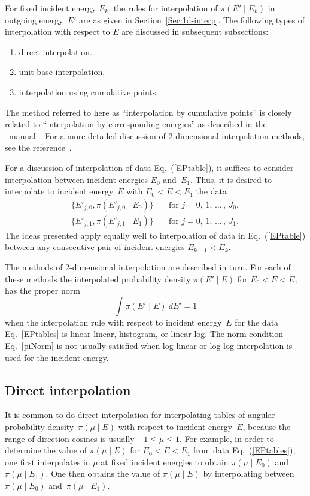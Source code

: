 For fixed incident energy $E_k$, the rules for interpolation of 
$\pi(E' \mid E_k )$ in outgoing energy~$E'$ are as given
in Section~\ref{Sec:1d-interp}.  The following types
of interpolation with respect to $E$ are discussed in subsequent subsections:
\begin{enumerate}
 \item direct interpolation.
 \item unit-base interpolation,
 \item interpolation using cumulative points.
\end{enumerate}

The method referred to here as ``interpolation by cumulative points''
is closely related to ``interpolation by corresponding energies'' as described
in the \ENDF\ manual~\cite{ENDFB}.  
For a more-detailed discussion of 2-dimensional interpolation methods,
see the reference~\cite{interpolation}.

For a discussion of interpolation of data Eq.~(\ref{EPtable}), it suffices
to consider interpolation between incident energies $E_0$ and~$E_1$.
Thus, it is desired to interpolate to incident energy~$E$ with
$E_0 < E < E_1$ the data
\begin{equation}
\begin{split}
  \{ E'_{j,0}, \pi(E'_{j,0} \mid E_0 )\} &\quad \text{for $j = 0$, 1, $\ldots\,$, $J_0$}, \\
  \{ E'_{j,1}, \pi(E'_{j,1} \mid E_1 )\} &\quad \text{for $j = 0$, 1, $\ldots\,$, $J_1$}.
  \label{EPtables}
\end{split}
\end{equation}
The ideas presented apply equally well to interpolation of data
in Eq.~(\ref{EPtable}) between any consecutive pair of
incident energies $E_{k-1} < E_k$.

The methods of 2-dimensional interpolation are described in turn.
For each of these methods the interpolated probability density $\pi(E' \mid E)$
for $E_0 < E < E_1$ has the proper norm
\begin{equation}
  \int
  \pi(E' \mid E) \ dE' = 1
  \label{piNorm}
\end{equation}
when the interpolation rule with respect to incident energy~$E$ for the
data Eq.~\eqref{EPtables} is linear-linear, histogram, or linear-log.
The norm condition Eq.~\eqref{piNorm} is not usually satisfied when
log-linear or log-log interpolation is used for the incident energy.

\subsection{Direct interpolation}\label{Sec:direct-interp}
It is common to do direct interpolation for interpolating tables of angular probability
density~$\pi( \mu \mid E)$ with respect to incident energy~$E$, because the
range of direction cosines is usually $-1 \le \mu \le 1$.  For example, in order
to determine the value of $\pi( \mu \mid E)$ for $E_0 < E < E_1$ from data
Eq.~(\ref{EPtables}), one first interpolates in $\mu$
at fixed incident energies to obtain $\pi( \mu \mid E_0)$ and~$\pi( \mu \mid E_1)$.
One then obtains the value of $\pi( \mu \mid E)$ by interpolating between
$\pi( \mu \mid E_0)$ and~$\pi( \mu \mid E_1)$.


